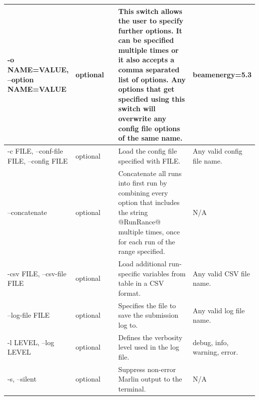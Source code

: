 \documentclass[11pt]{article}
\begin{document}
\begin{table}[!ht]
\begin{tabular}{|p{0.2\linewidth}|p{0.2\linewidth}|p{0.4\linewidth}|p{0.2\linewidth}|}
-o NAME=VALUE, --option NAME=VALUE       & optional               & This switch allows the user to specify further options. It can be specified multiple times or it also accepts a comma separated list of options. Any options that get specified using this switch will overwrite any config file options of the same name. & beamenergy=5.3                 \\ \hline
-c FILE, --conf-file FILE, --config FILE & optional               & Load the config file specified with FILE.                                                                                                                                                                                                                  & Any valid config file name.    \\ \hline
--concatenate                            & optional               & Concatenate all runs into first run by combining every option that includes the string @RunRance@ multiple times, once for each run of the range specified.                                                                                                & N/A                            \\ \hline
-csv FILE, --csv-file FILE               & optional               & Load additional run-specific variables from table in a CSV format.                                                                                                                                                                                         & Any valid CSV file name.       \\ \hline
--log-file FILE                          & optional               & Specifies the file to save the submission log to.                                                                                                                                                                                                          & Any valid log file name.       \\ \hline
-l LEVEL, --log LEVEL                    & optional               & Defines the verbosity level used in the log file.                                                                                                                                                                                                          & debug, info, warning, error.   \\ \hline
-s, --silent                             & optional               & Suppress non-error Marlin output to the terminal.                                                                                                                                                                                                          & N/A                            \\ \hline

\end{tabular}
\end{table}
\end{document}

